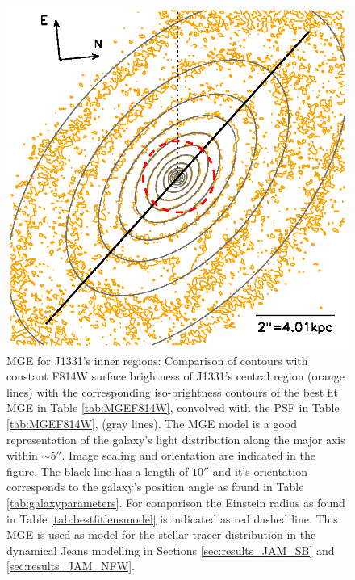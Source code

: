 \begin{figure}
\centering
\includegraphics[width=0.8\columnwidth]{fig/1331F814Wsci_MGE_M.ps}
\caption{MGE for J1331's inner regions: Comparison of contours with constant F814W surface brightness of J1331's central region (orange lines) with the corresponding iso-brightness contours of the best fit MGE in Table \ref{tab:MGEF814W}, convolved with the PSF in Table \ref{tab:MGEF814W}, (gray lines). The MGE model is a good representation of the galaxy's light distribution along the major axis within $\sim 5''$. Image scaling and orientation are indicated in the figure. The black line has a length of $10''$ and it's orientation corresponds to the galaxy's position angle as found in Table \ref{tab:galaxyparameters}. For comparison the Einstein radius as found in Table \ref{tab:bestfitlensmodel}  is indicated as red dashed line. This MGE is used as model for the stellar tracer distribution in the dynamical Jeans modelling in Sections \ref{sec:results_JAM_SB} and \ref{sec:results_JAM_NFW}.}
\label{fig:MGEinnerRegions}
\end{figure}

